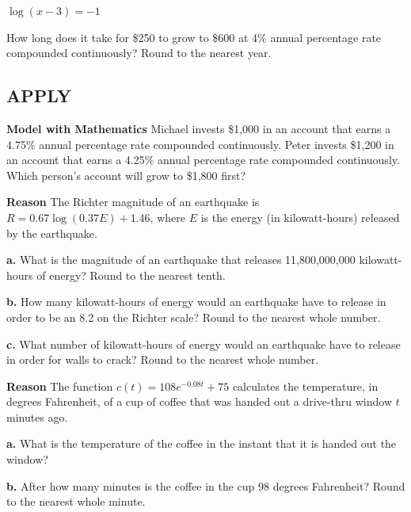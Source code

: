 \documentclass{article}
\newenvironment{practice}[2]{}{}
\newcommand{\placeholder}[2]{}
\begin{document}
\begin{practice}{51}{?}
$\log (x - 3) = -1$
\end{practice}

\begin{practice}{52}{?}
How long does it take for \$250 to grow to \$600 at 4\% annual percentage rate compounded continuously? Round to the nearest year.
\end{practice}

\subsection*{APPLY}

\begin{practice}{53}{?}
\textbf{Model with Mathematics} Michael invests \$1,000 in an account that earns a 4.75\% annual percentage rate compounded continuously. Peter invests \$1,200 in an account that earns a 4.25\% annual percentage rate compounded continuously. Which person's account will grow to \$1,800 first?
\end{practice}

\begin{practice}{54}{?}
\textbf{Reason} The Richter magnitude of an earthquake is $R = 0.67\log(0.37E) + 1.46$, where $E$ is the energy (in kilowatt-hours) released by the earthquake.

\textbf{a.} What is the magnitude of an earthquake that releases 11,800,000,000 kilowatt-hours of energy? Round to the nearest tenth.

\textbf{b.} How many kilowatt-hours of energy would an earthquake have to release in order to be an 8.2 on the Richter scale? Round to the nearest whole number.

\textbf{c.} What number of kilowatt-hours of energy would an earthquake have to release in order for walls to crack? Round to the nearest whole number.

\placeholder{illustration}{Image showing a cracked wall with the text: "At a richter magnitude of 4 and above, the walls in your house may start to crack." Below is a scale from 1 to 10 with "Not felt" on the left and "Extreme" on the right. The number 4 is circled.}
\end{practice}

\begin{practice}{55}{?}
\textbf{Reason} The function $c(t) = 108e^{-0.08t} + 75$ calculates the temperature, in degrees Fahrenheit, of a cup of coffee that was handed out a drive-thru window $t$ minutes ago.

\textbf{a.} What is the temperature of the coffee in the instant that it is handed out the window?

\textbf{b.} After how many minutes is the coffee in the cup 98 degrees Fahrenheit? Round to the nearest whole minute.
\end{practice}
\end{document}
